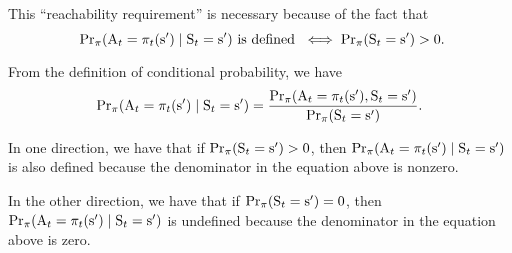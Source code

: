 \documentclass{rl_theory/note}
\begin{document}
\begin{note}
  This ``reachability requirement'' is necessary
  because of the fact that
  $$\text{ 
  $
  {\rm Pr}_{\pi}({\rm A}_t = \pi_t({\rm s}') \mid {\rm S}_t = {\rm s}')$
  is defined } 
  \iff 
  {\rm Pr}_{\pi}({\rm S}_{t} = {\rm s}') > 0
  .$$%

  From the definition of conditional probability, we have
  $$ 
  {\rm Pr}_{\pi}({\rm A}_t = \pi_t({\rm s}') \mid {\rm S}_t = {\rm s}')
  = 
  \frac
  {{\rm Pr}_{\pi}({\rm A}_t = \pi_t({\rm s}'), {\rm S}_t = {\rm s}')}
  {{\rm Pr}_{\pi}({\rm S}_t = {\rm s}')}.$$

  In one direction, we have that if ${\rm Pr}_{\pi}({\rm S}_t = {\rm s}') > 0$, then 
  $ {\rm Pr}_{\pi}({\rm A}_t = \pi_t({\rm s}') \mid {\rm S}_t = {\rm s}') $
  is also defined because the denominator in the equation above is nonzero.

  In the other direction, we have that if ${\rm Pr}_{\pi}({\rm S}_t = {\rm s}') = 0$, then 
  $ {\rm Pr}_{\pi}({\rm A}_t = \pi_t({\rm s}') \mid {\rm S}_t = {\rm s}') $
  is undefined because the denominator in the equation above is zero.
\end{note}
\end{document}
